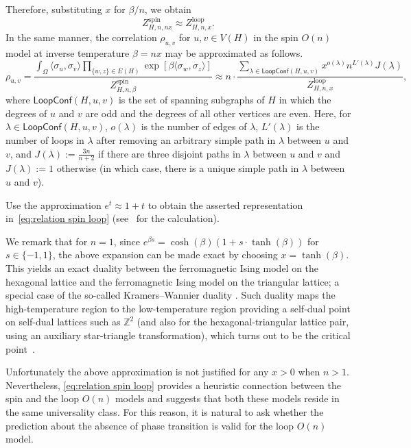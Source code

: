 \documentclass[12pt,reqno]{article}
\def\Z{\mathbb{Z}}
\newcommand{\LC}{\mathsf{LoopConf}}
\begin{document}
Therefore, substituting $x$ for $\beta/n$, we obtain
\[
Z_{H,n,nx}^{\text{spin}} \approx Z_{H,n,x}^{\text{loop}}.
\]
In the same manner, the correlation $\rho_{u,v}$ for $u,v\in V(H)$ in the spin $O(n)$ model at inverse temperature $\beta = nx$ may be approximated as follows.
\begin{equation}\label{eq:relation spin loop}
    \rho_{u,v} = \frac{ \displaystyle\int_{\Omega} \langle \sigma_u, \sigma_v \rangle \prod_{\{w,z\}\in E(H)} \exp \left[\beta \langle \sigma_w,\sigma_z \rangle \right]}{Z_{H,n,\beta}^{\text{spin}}} \approx n\cdot \frac{\displaystyle \sum_{\lambda \in \LC(H,u,v)} x^{o(\lambda)} n^{L'(\lambda)} J(\lambda)}{Z_{H,n,x}^{\text{loop}}},
\end{equation}
where $\LC(H,u,v)$ is the set of spanning subgraphs of $H$
in which the degrees of $u$ and $v$ are odd and the degrees of all
other vertices are even. Here, for $\lambda \in \LC(H,u,v)$, $o(\lambda)$ is the number of edges of $\lambda$, $L'(\lambda)$ is the number of loops in $\lambda$ after removing an arbitrary simple path in $\lambda$ between $u$ and $v$, and
$J(\lambda):=\tfrac{3n}{n+2}$ if there are three disjoint paths in
$\lambda$ between $u$ and $v$ and $J(\lambda):=1$ otherwise (in which
case, there is a unique simple path in $\lambda$ between $u$ and
$v$).

\medbreak {} Use the approximation $e^t
\approx 1+t$ to obtain the asserted representation
in~\eqref{eq:relation spin loop} (see~\cite[Appendix A]{DCPSS14} for
the calculation). \medbreak

We remark that for $n=1$, since $e^{\beta s} = \cosh(\beta)(1 + s\cdot \tanh(\beta))$ for $s\in\{-1,1\}$, the above expansion can be made exact by choosing $x=\tanh(\beta)$. This yields an exact duality between the ferromagnetic Ising model on the hexagonal lattice and the ferromagnetic Ising model on the triangular lattice; a special case of the so-called Kramers--Wannier duality \cite{KraWan41}. Such duality maps the high-temperature region to the low-temperature region providing a self-dual point on self-dual lattices such as $\Z^2$ (and also for the hexagonal-triangular lattice pair, using an auxiliary star-triangle transformation), which turns out to be the critical point~\cite{Ons44}.

Unfortunately the above approximation is not justified for any
$x>0$ when $n>1$. Nevertheless, \eqref{eq:relation spin loop} provides a
heuristic connection between the spin and the loop $O(n)$ models and
suggests that both these models reside in the same universality
class. For this reason, it is natural to ask whether the prediction
about the absence of phase transition is valid for the loop $O(n)$
model.
\end{document}
